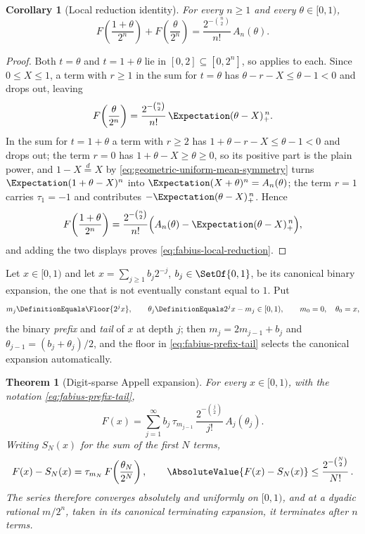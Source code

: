 \documentclass[11pt,a4paper,oneside,openany]{book}
\newtheorem{theorem}{Theorem}[chapter]
\newtheorem{corollary}[corollary]{Corollary}
\theoremstyle{definition}
\theoremstyle{remark}
\begin{document}
\begin{corollary}[Local reduction identity]\label{cor:fabius-local-reduction}
For every $n\ge1$ and every $\theta\in[0,1)$,
\begin{equation}\label{eq:fabius-local-reduction}
 F\!\left(\frac{1+\theta}{2^n}\right)+F\!\left(\frac{\theta}{2^n}\right)
 =\frac{2^{-\binom n2}}{n!}\,A_n(\theta).
\end{equation}
\end{corollary}

\begin{proof}
Both $t=\theta$ and $t=1+\theta$ lie in $[0,2]\subseteq[0,2^n]$, so
 applies to each.  Since $0\le X\le1$, a term with
$r\ge1$ in the sum for $t=\theta$ has $\theta-r-X\le\theta-1<0$ and drops out,
leaving
\[
 F\!\left(\frac{\theta}{2^n}\right)
 =\frac{2^{-\binom n2}}{n!}\,\Expectation(\theta-X)_+^{\,n}.
\]
In the sum for $t=1+\theta$ a term with $r\ge2$ has $1+\theta-r-X\le\theta-1<0$
and drops out; the term $r=0$ has $1+\theta-X\ge\theta\ge0$, so its positive part
is the plain power, and $1-X\overset d=X$ by
\eqref{eq:geometric-uniform-mean-symmetry} turns
$\Expectation(1+\theta-X)^n$ into $\Expectation(X+\theta)^n=A_n(\theta)$; the term
$r=1$ carries $\tau_1=-1$ and contributes $-\Expectation(\theta-X)_+^{\,n}$.  Hence
\[
 F\!\left(\frac{1+\theta}{2^n}\right)
 =\frac{2^{-\binom n2}}{n!}\Bigl(A_n(\theta)-\Expectation(\theta-X)_+^{\,n}\Bigr),
\]
and adding the two displays proves \eqref{eq:fabius-local-reduction}.
\end{proof}

Let $x\in[0,1)$ and let $x=\sum_{j\ge1}b_j2^{-j}$, $b_j\in\SetOf{0,1}$, be its
canonical binary expansion, the one that is not eventually constant equal to
$1$.  Put
\begin{equation}\label{eq:fabius-prefix-tail}
 m_j\DefinitionEquals\Floor{2^jx},
 \qquad
 \theta_j\DefinitionEquals2^jx-m_j\in[0,1),
 \qquad
 m_0=0,\quad\theta_0=x,
\end{equation}
the binary \emph{prefix} and \emph{tail} of $x$ at depth $j$; then
$m_j=2m_{j-1}+b_j$ and $\theta_{j-1}=(b_j+\theta_j)/2$, and the floor in
\eqref{eq:fabius-prefix-tail} selects the canonical expansion automatically.

\begin{theorem}[Digit-sparse Appell expansion]\label{thm:fabius-digit-expansion}
For every $x\in[0,1)$, with the notation \eqref{eq:fabius-prefix-tail},
\begin{equation}\label{eq:fabius-digit-appell}
 \boxed{\;
 F(x)=\sum_{j=1}^{\infty}
 b_j\,\tau_{m_{j-1}}\,\frac{2^{-\binom j2}}{j!}\,A_j(\theta_j).\;}
\end{equation}
Writing $S_N(x)$ for the sum of the first $N$ terms,
\begin{equation}\label{eq:fabius-digit-residual}
 F(x)-S_N(x)=\tau_{m_N}\,F\!\left(\frac{\theta_N}{2^N}\right),
 \qquad
 \AbsoluteValue{F(x)-S_N(x)}\le\frac{2^{-\binom N2}}{N!}\,.
\end{equation}
The series therefore converges absolutely and uniformly on $[0,1)$, and at a
dyadic rational $m/2^n$, taken in its canonical terminating expansion, it
terminates after $n$ terms.
\end{theorem}
\end{document}
